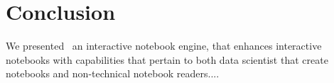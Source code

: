 \section{Conclusion}
\label{section:conclusion}

We presented \projname\ an interactive notebook engine, that enhances interactive notebooks with capabilities that pertain to both data scientist that create notebooks and non-technical notebook readers....